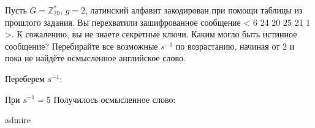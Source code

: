 \begin{problem}
     Пусть \(G = \mathbb{Z}_{29}^*\), \( g = 2\), латинский алфавит закодирован при помощи таблицы из прошлого задания. Вы перехватили зашифрованное сообщение < 6 24 20 25 21 1 >. К сожалению, вы не знаете секретные ключи. Каким могло быть истинное сообщение? Перебирайте все возможные \(s^{-1}\) по возрастанию, начиная от 2 и пока не найдёте осмысленное английское слово.
\end{problem}
\begin{solution} Переберем \( s^{-1} \):
    
    При \(s^{-1} = 5 \) Получилось осмысленное слово:
    \begin{center}
        admire
    \end{center}
\end{solution}